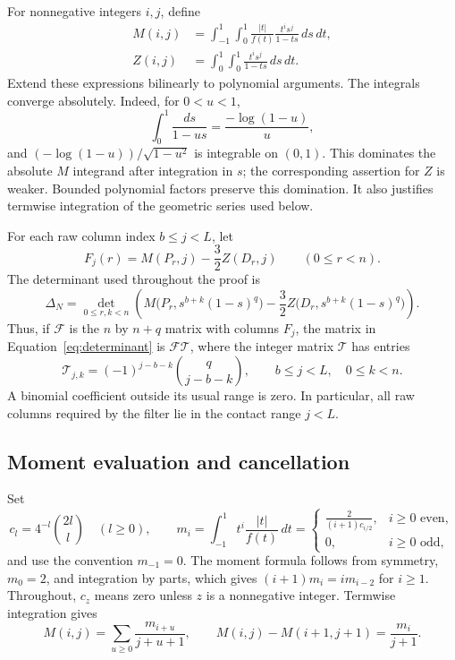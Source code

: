 For nonnegative integers $i,j$, define
\begin{equation}\label{eq:mixed-moments}
\begin{split}
M(i,j)&=\int_{-1}^1\int_0^1
 \frac{|t|}{f(t)}\frac{t^i s^j}{1-ts}\,ds\,dt,\\
Z(i,j)&=\int_0^1\int_0^1\frac{t^i s^j}{1-ts}\,ds\,dt.
\end{split}
\end{equation}
Extend these expressions bilinearly to polynomial arguments.
The integrals converge absolutely. Indeed, for $0<u<1$,
\[
\int_0^1\frac{ds}{1-us}=\frac{-\log(1-u)}{u},
\]
and $(-\log(1-u))/\sqrt{1-u^2}$ is integrable on $(0,1)$.
This dominates the absolute $M$ integrand after integration in $s$;
the corresponding assertion for $Z$ is weaker. Bounded polynomial factors
preserve this domination. It also justifies termwise integration of the
geometric series used below.

For each raw column index $b\le j<L$, let
\[
F_j(r)=M(P_r,j)-\frac32 Z(D_r,j)\qquad(0\le r<n).
\]
The determinant used throughout the proof is
\begin{equation}\label{eq:determinant}
\Delta_N=\det_{0\le r,k<n}
\left(M\bigl(P_r,s^{b+k}(1-s)^q\bigr)
      -\frac32Z\bigl(D_r,s^{b+k}(1-s)^q\bigr)\right).
\end{equation}
Thus, if $\mathcal F$ is the $n$ by $n+q$ matrix with columns $F_j$,
the matrix in Equation~\eqref{eq:determinant} is $\mathcal F\mathcal T$,
where the integer matrix $\mathcal T$ has entries
\begin{equation}\label{eq:integer-filter}
\mathcal T_{j,k}=(-1)^{j-b-k}\binom{q}{j-b-k},
\qquad b\le j<L,\quad 0\le k<n.
\end{equation}
A binomial coefficient outside its usual range is zero. In particular,
all raw columns required by the filter lie in the contact range $j<L$.

\subsection{Moment evaluation and cancellation}

Set
\begin{equation}\label{eq:moment-values}
c_l=4^{-l}\binom{2l}{l}\quad(l\ge0),\qquad
m_i=\int_{-1}^1t^i\frac{|t|}{f(t)}\,dt
=\begin{cases}\displaystyle\frac{2}{(i+1)c_{i/2}},&i\ge0\text{ even},\\
0,&i\ge0\text{ odd},\end{cases}
\end{equation}
and use the convention $m_{-1}=0$.
The moment formula follows from symmetry, $m_0=2$, and integration by
parts, which gives $(i+1)m_i=i m_{i-2}$ for $i\ge1$.
Throughout, $c_z$ means zero unless $z$ is a nonnegative integer.
Termwise integration gives
\begin{equation}\label{eq:moment-series}
M(i,j)=\sum_{u\ge0}\frac{m_{i+u}}{j+u+1},\qquad
M(i,j)-M(i+1,j+1)=\frac{m_i}{j+1}.
\end{equation}

